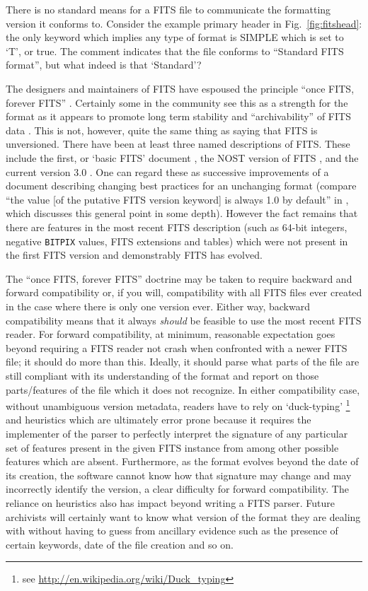 \documentclass[final,authoryear,5p,times,twocolumn]{elsarticle}
\begin{document}
{{There is no standard means for a FITS file to communicate
the formatting version it conforms to.  Consider the example primary
header in Fig.~\ref{fig:fitshead}: the only keyword which implies any
type of format is SIMPLE which is set to `T', or true. The comment
indicates that the file conforms to ``Standard FITS format'', but what
indeed is that `Standard'?


The designers and maintainers of FITS have espoused the principle
``once FITS, forever FITS''
\citep[see e.g.,][]{1988A&AS...73..359G,1993FITS1}.  Certainly some in the
community see this as a strength for the format as it appears to
promote long term stability and ``archivability'' of FITS data
\citep{2012EWASSAlle,2012LOC}.  This is not, however, quite the same
thing as saying that FITS is unversioned.  There have been at least
three named descriptions of FITS.  These include the first, or `basic
FITS' document \citep{1979ipia.coll..445W,1981A&AS...44..363W}, the
NOST version of FITS \citep{2001A&A...376..359H}, and the current
version 3.0 \citep{2010A&A...524A..42P}.  One can regard these as
successive improvements of a document describing changing best
practices for an unchanging format (compare ``the value [of the
putative FITS version keyword] is always 1.0 by default'' in
\citet{1997ASPC..125..257W}, which discusses this general point in
some depth). However the fact remains that there are features in the
most recent FITS description (such as 64-bit integers, negative
\texttt{BITPIX} values, FITS extensions and tables) which were not
present in the first FITS version and demonstrably FITS has evolved.


The ``once FITS, forever FITS'' doctrine may be taken to require
backward and forward compatibility or, if you will, compatibility
with all FITS files ever created in the case where there is only
one version ever.
Either way, backward compatibility means that it always
\emph{should} be feasible to use the most recent FITS reader. For
forward compatibility, at minimum, reasonable expectation goes
beyond requiring a FITS reader not crash when confronted with a newer
FITS file; it should do more than this. Ideally, it should parse
what parts of the file are still compliant with
its understanding of the format and report on those parts/features
of the file which it does not recognize. In either compatibility case,
without unambiguous version metadata, readers have to rely on `duck-typing'
\footnote{see \url{http://en.wikipedia.org/wiki/Duck\_typing}}
and heuristics which are ultimately error prone because it requires
the implementer of the parser to perfectly interpret the signature
of any particular set of features present in the given FITS instance
from among other possible features which are absent. Furthermore, as
the format evolves beyond the date of its creation, the software cannot
know how that signature may change and may incorrectly
identify the version, a clear difficulty for forward compatibility.
The reliance on heuristics also has impact beyond writing a FITS parser.
Future archivists will certainly want to know what version of the
format they are dealing with without having to guess from ancillary
evidence such as the presence of certain keywords, date of the file
creation and so on.


}}
\end{document}
